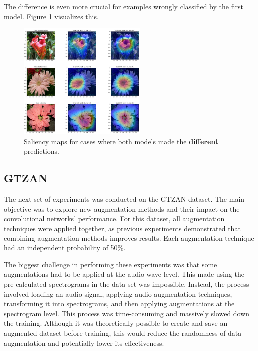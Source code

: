 The difference is even more crucial for examples wrongly classified by the first model. Figure \ref{fig:saliencySummary2} visualizes this.

\begin{figure}[!h]
    \centering
    \includegraphics[width=0.55\textwidth]{Images/saliency-oneshot/diff_summary.jpg}
    \caption{Saliency maps for cases where both models made the \textbf{different} predictions.}
    \label{fig:saliencySummary2}
\end{figure}

\subsection{GTZAN}
\label{ssec:resultsGTZAN}

The next set of experiments was conducted on the GTZAN dataset. The main objective was to explore new augmentation methods and their impact on the convolutional networks' performance. For this dataset, all augmentation techniques were applied together, as previous experiments demonstrated that combining augmentation methods improves results. Each augmentation technique had an independent probability of 50\%. 

The biggest challenge in performing these experiments was that some augmentations had to be applied at the audio wave level. This made using the pre-calculated spectrograms in the data set was impossible. Instead, the process involved loading an audio signal, applying audio augmentation techniques, transforming it into spectrograms, and then applying augmentations at the spectrogram level. This process was time-consuming and massively slowed down the training. Although it was theoretically possible to create and save an augmented dataset before training, this would reduce the randomness of data augmentation and potentially lower its effectiveness.

